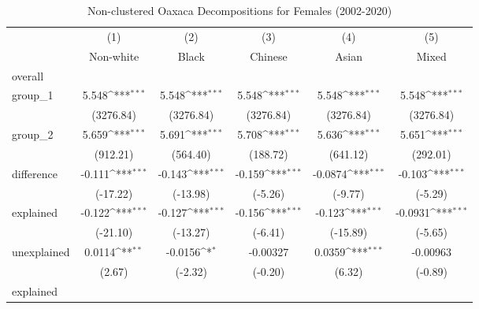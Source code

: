 \begin{table}[htbp]\centering
\def\sym#1{\ifmmode^{#1}\else\(^{#1}\)\fi}
\caption{Non-clustered Oaxaca Decompositions for Females (2002-2020)\label{tab1}}
\begin{tabular}{l*{5}{c}}
\hline\hline
            &\multicolumn{1}{c}{(1)}&\multicolumn{1}{c}{(2)}&\multicolumn{1}{c}{(3)}&\multicolumn{1}{c}{(4)}&\multicolumn{1}{c}{(5)}\\
            &\multicolumn{1}{c}{Non-white}&\multicolumn{1}{c}{Black}&\multicolumn{1}{c}{Chinese}&\multicolumn{1}{c}{Asian}&\multicolumn{1}{c}{Mixed}\\
\hline
overall     &                     &                     &                     &                     &                     \\
group\_1     &       5.548\sym{***}&       5.548\sym{***}&       5.548\sym{***}&       5.548\sym{***}&       5.548\sym{***}\\
            &   (3276.84)         &   (3276.84)         &   (3276.84)         &   (3276.84)         &   (3276.84)         \\
group\_2     &       5.659\sym{***}&       5.691\sym{***}&       5.708\sym{***}&       5.636\sym{***}&       5.651\sym{***}\\
            &    (912.21)         &    (564.40)         &    (188.72)         &    (641.12)         &    (292.01)         \\
difference  &      -0.111\sym{***}&      -0.143\sym{***}&      -0.159\sym{***}&     -0.0874\sym{***}&      -0.103\sym{***}\\
            &    (-17.22)         &    (-13.98)         &     (-5.26)         &     (-9.77)         &     (-5.29)         \\
explained   &      -0.122\sym{***}&      -0.127\sym{***}&      -0.156\sym{***}&      -0.123\sym{***}&     -0.0931\sym{***}\\
            &    (-21.10)         &    (-13.27)         &     (-6.41)         &    (-15.89)         &     (-5.65)         \\
unexplained &      0.0114\sym{**} &     -0.0156\sym{*}  &    -0.00327         &      0.0359\sym{***}&    -0.00963         \\
            &      (2.67)         &     (-2.32)         &     (-0.20)         &      (6.32)         &     (-0.89)         \\
\hline
explained   &                     &                     &                     &                     &                     \\

\end{tabular}
\end{table}

